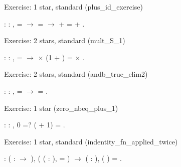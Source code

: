\documentclass[12pt]{report}
\begin{document}
Exercise: 1 star, standard (plus\_id\_exercise) \begin{coqdoccode}
\coqdocemptyline
\coqdocnoindent
{}  : \coqdockw{\ensuremath{\forall}}    : ,\coqdoceol
\coqdocindent{1.00em}
 =  \ensuremath{\rightarrow}  =  \ensuremath{\rightarrow}\coqdoceol
\coqdocindent{1.00em}
 +  =  + .\coqdoceol
\coqdocemptyline
\end{coqdoccode}
Exercise: 2 stars, standard (mult\_S\_1) \begin{coqdoccode}
\coqdocemptyline
\coqdocnoindent
{}  : \coqdockw{\ensuremath{\forall}}   : ,\coqdoceol
\coqdocindent{1.00em}
 =   \ensuremath{\rightarrow}\coqdoceol
\coqdocindent{1.00em}
 \ensuremath{\times} (1 + ) =  \ensuremath{\times} .\coqdoceol
\coqdocemptyline
\end{coqdoccode}
Exercise: 2 stars, standard (andb\_true\_elim2) \begin{coqdoccode}
\coqdocemptyline
\coqdocnoindent
{}  : \coqdockw{\ensuremath{\forall}}   : ,\coqdoceol
\coqdocindent{1.00em}
   =  \ensuremath{\rightarrow}\coqdoceol
\coqdocindent{1.00em}
 = .\coqdoceol
\coqdocemptyline
\end{coqdoccode}
Exercise: 1 star (zero\_nbeq\_plus\_1)  \begin{coqdoccode}
\coqdocemptyline
\coqdocnoindent
{}  : \coqdockw{\ensuremath{\forall}}  : ,\coqdoceol
\coqdocindent{1.00em}
0 =? ( + 1) = .\coqdoceol
\coqdocemptyline
\end{coqdoccode}
Exercise: 1 star, standard (indentity\_fn\_applied\_twice)  \begin{coqdoccode}
\coqdocemptyline
\coqdocnoindent
{}  :\coqdoceol
\coqdocindent{1.00em}
\coqdockw{\ensuremath{\forall}} ( :  \ensuremath{\rightarrow} ), (\coqdockw{\ensuremath{\forall}} ( : ),   = ) \ensuremath{\rightarrow}\coqdoceol
\coqdocindent{1.00em}
\coqdockw{\ensuremath{\forall}} ( : ),  ( ) = .\coqdoceol
\coqdocemptyline
\end{coqdoccode}
\end{document}
